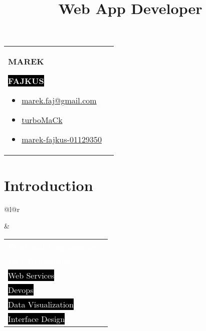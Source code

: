 \documentclass[9pt]{article}
\makeatletter
\def\firstname{Marek}
\def\lastname{Fajkus}
\def\faEmail{{\FAFR \symbol{"F0E0}}} %
\def\faLinkedin{\FAB \symbol{"F08C}} %
\def\faGithub{\FAB \symbol{"F09B}} %
\def\faStarEmpty{\FAFR \symbol{"F005}} %
\def\faStarFull{\FAFS \symbol{"F005}} %
\def\faStarHalf{\FAFS \symbol{"F5C0}} %
\renewcommand{\maketitle}{
  \begin{tabularx}{\textwidth}{@{}l l}
    \begin{minipage}[t]{0.65\textwidth}
      {\Huge \textbf {\MakeUppercase{\firstname}}}

      \vspace{0.2cm}

      \colorbox{black}{
        {\huge \textbf {\textcolor{white}{\MakeUppercase{\lastname}}}}
      }

      \vspace{0.4cm}

      {\LARGE\emph\thetitle}
    \end{minipage}

    \begin{minipage}[t]{0.35\textwidth}
      \vspace{-\baselineskip} %
      \begin{itemize}
        \itemsep0em
      \vspace{-0.5cm}
      \item \href{mailto:marek.faj@gmail.com}{
        \colorbox{ProcessBlue}{\textcolor{white}{\faEmail}} { \textcolor{ProcessBlue}{marek.faj@gmail.com}}
      }
      \item \href{https://github.com/turbomack}{
        \colorbox{black}{\textcolor{white}{\faGithub}} { turboMaCk}
      }
      \item \href{https://www.linkedin.com/in/marek-fajkus-01129350/}{
        \colorbox{black}{\textcolor{white}{\faLinkedin}} { marek-fajkus-01129350}
      }
      \end{itemize}
    \end{minipage}
  \end{tabularx}

  \vspace{0.5cm}
}
\makeatother
\begin{document}
\title{Web App Developer}
\maketitle

\section{Introduction}

\begin{tabular}{@{}l@{\hskip 10pt}r}
    \begin{minipage}[l]{0.6\textwidth}
      \blindtext
    \end{minipage}
    &
    \begin{minipage}[r]{0.39\textwidth}
      \setlength\tabcolsep{5pt}
      \begin{tabularx}{\textwidth}{Xr}
          \colorbox{ProcessBlue}{\textcolor{white}{Functional Programming}} &
          \vspace{0.2cm}
          \textcolor{ProcessBlue}{\faStarFull \faStarFull \faStarFull \faStarEmpty \faStarEmpty} \\

          \colorbox{ProcessBlue}{\textcolor{white}{Web Technologies}} &
          \vspace{0.2cm}
          \textcolor{ProcessBlue}{\faStarFull \faStarFull \faStarFull \faStarFull \faStarEmpty} \\

          \colorbox{black}{\textcolor{white}{Web Services}} &
          \vspace{0.2cm}
          \faStarFull \faStarFull \faStarFull \faStarEmpty \faStarEmpty \\

          \colorbox{black}{\textcolor{white}{Devops}} &
          \vspace{0.2cm}
          \faStarFull \faStarFull \faStarHalf \faStarEmpty \faStarEmpty \\

          \colorbox{black}{\textcolor{white}{Data Visualization}} &
          \vspace{0.2cm}
          \faStarFull \faStarFull \faStarFull \faStarEmpty \faStarEmpty \\

          \colorbox{black}{\textcolor{white}{Interface Design}} &
          \vspace{0.2cm}
          \faStarFull \faStarFull \faStarHalf \faStarEmpty \faStarEmpty \\


\end{tabularx}
\end{minipage}
\end{tabular}
\end{document}
